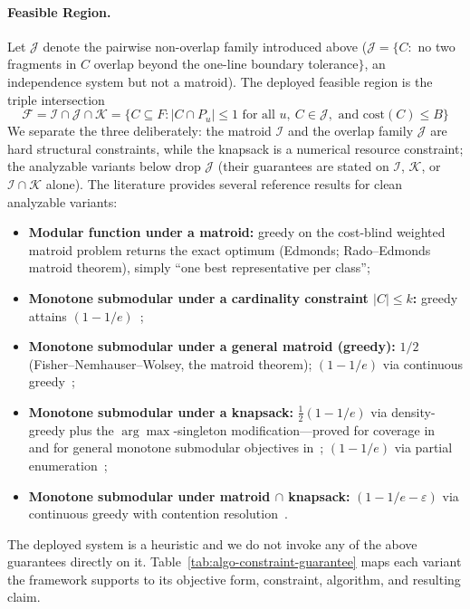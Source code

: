 \documentclass[11pt, a4paper]{article}
\begin{document}
\paragraph{Feasible Region.} Let $\mathcal{J}$ denote the pairwise non-overlap family introduced above ($\mathcal{J} = \{C : $ no two fragments in $C$ overlap beyond the one-line boundary tolerance$\}$, an independence system but not a matroid). The deployed feasible region is the triple intersection
\begin{equation}
\mathcal{F} = \mathcal{I} \cap \mathcal{J} \cap \mathcal{K} = \{C \subseteq F : |C \cap P_u| \leq 1 \text{ for all } u,\ C \in \mathcal{J}, \text{ and } \mathrm{cost}(C) \leq B\}
\end{equation}
We separate the three deliberately: the matroid $\mathcal{I}$ and the overlap family $\mathcal{J}$ are hard structural constraints, while the knapsack is a numerical resource constraint; the analyzable variants below drop $\mathcal{J}$ (their guarantees are stated on $\mathcal{I}$, $\mathcal{K}$, or $\mathcal{I} \cap \mathcal{K}$ alone). The literature provides several reference results for clean analyzable variants:
\begin{itemize}
    \item \textbf{Modular function under a matroid:} greedy on the cost-blind weighted matroid problem returns the exact optimum (Edmonds; Rado--Edmonds matroid theorem), simply ``one best representative per class'';
    \item \textbf{Monotone submodular under a cardinality constraint $|C| \leq k$:} greedy attains $(1-1/e)$~\cite{nemhauser1978analysis};
    \item \textbf{Monotone submodular under a general matroid (greedy):} $1/2$~\cite{fisher1978analysis2} (Fisher--Nemhauser--Wolsey, the matroid theorem); $(1-1/e)$ via continuous greedy~\cite{calinescu2011maximizing};
    \item \textbf{Monotone submodular under a knapsack:} $\frac{1}{2}(1-1/e)$ via density-greedy plus the $\arg\max$-singleton modification---proved for coverage in~\cite{khuller1999budgeted} and for general monotone submodular objectives in~\cite{krause2005note,leskovec2007cost}; $(1-1/e)$ via partial enumeration~\cite{sviridenko2004note};
    \item \textbf{Monotone submodular under matroid $\cap$ knapsack:} $(1-1/e-\varepsilon)$ via continuous greedy with contention resolution~\cite{chekuri2014submodular}.
\end{itemize}
The deployed system is a heuristic and we do not invoke any of the above guarantees directly on it. Table~\ref{tab:algo-constraint-guarantee} maps each variant the framework supports to its objective form, constraint, algorithm, and resulting claim.
\end{document}
